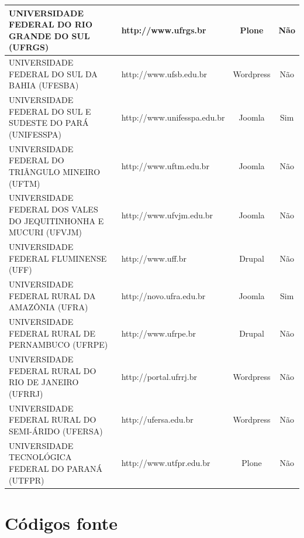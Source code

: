\begin{quadro}[htb]
{\begin{tabular}{|l|l|c|c|}
			UNIVERSIDADE FEDERAL DO RIO GRANDE DO SUL (UFRGS)                              & http://www.ufrgs.br               & Plone     & Não           \\ \hline
			UNIVERSIDADE FEDERAL DO SUL DA BAHIA (UFESBA)                                  & http://www.ufsb.edu.br            & Wordpress & Não           \\ \hline
			UNIVERSIDADE FEDERAL DO SUL E SUDESTE DO PARÁ (UNIFESSPA)                      & http://www.unifesspa.edu.br       & Joomla    & Sim           \\ \hline
			UNIVERSIDADE FEDERAL DO TRIÂNGULO MINEIRO (UFTM)                               & http://www.uftm.edu.br            & Joomla    & Não           \\ \hline
			UNIVERSIDADE FEDERAL DOS VALES DO JEQUITINHONHA E MUCURI (UFVJM)               & http://www.ufvjm.edu.br           & Joomla    & Não           \\ \hline
			UNIVERSIDADE FEDERAL FLUMINENSE (UFF)                                          & http://www.uff.br                 & Drupal    & Não           \\ \hline
			UNIVERSIDADE FEDERAL RURAL DA AMAZÔNIA (UFRA)                                  & http://novo.ufra.edu.br           & Joomla    & Sim           \\ \hline
			UNIVERSIDADE FEDERAL RURAL DE PERNAMBUCO (UFRPE)                               & http://www.ufrpe.br               & Drupal    & Não           \\ \hline
			UNIVERSIDADE FEDERAL RURAL DO RIO DE JANEIRO (UFRRJ)                           & http://portal.ufrrj.br            & Wordpress & Não           \\ \hline
			UNIVERSIDADE FEDERAL RURAL DO SEMI-ÁRIDO (UFERSA)                              & http://ufersa.edu.br              & Wordpress & Não           \\ \hline
			UNIVERSIDADE TECNOLÓGICA FEDERAL DO PARANÁ (UTFPR)                             & http://www.utfpr.edu.br           & Plone     & Não           \\ \hline
		\end{tabular}
	}
\end{quadro}

\clearpage 
\section{Códigos fonte}

